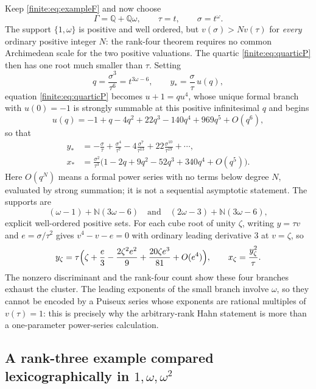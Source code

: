 \documentclass[11pt,letterpaper]{article}
\theoremstyle{definition}
\theoremstyle{remark}
\newcommand{\N}{\mathbb N}
\newcommand{\Q}{\mathbb Q}
\numberwithin{equation}{section}
\begin{document}
Keep \eqref{finite:eq:exampleF} and now choose
\[
 \Gamma=\Q+\Q\omega,\qquad \tau=t,\qquad\sigma=t^\omega .
\]
The support $\{1,\omega\}$ is positive and well ordered, but $v(\sigma)>Nv(\tau)$ for \emph{every} ordinary positive integer $N$: the rank-four theorem requires no common Archimedean scale for the two positive valuations. The quartic \eqref{finite:eq:quarticP} then has one root much smaller than $\tau$. Setting
\[
 q=\frac{\sigma^3}{\tau^6}=t^{3\omega-6},
 \qquad
 y_*=\frac\sigma\tau\,u(q),
\]
equation \eqref{finite:eq:quarticP} becomes $u+1=qu^4$, whose unique formal branch with $u(0)=-1$ is strongly summable at this positive infinitesimal $q$ and begins
\begin{equation}\label{finite:eq:usmall}
 u(q)=-1+q-4q^2+22q^3-140q^4+969q^5+O(q^6),
\end{equation}
so that
\begin{align}
 y_*&=-\frac\sigma\tau+\frac{\sigma^4}{\tau^7}-4\frac{\sigma^7}{\tau^{13}}
 +22\frac{\sigma^{10}}{\tau^{19}}+\cdots,
 \label{finite:eq:ysmall}\\
 x_*&=\frac{\sigma^2}{\tau^3}\bigl(1-2q+9q^2-52q^3+340q^4+O(q^5)\bigr).
 \label{finite:eq:xsmall}
\end{align}
Here $O(q^N)$ means a formal power series with no terms below degree $N$, evaluated by strong summation; it is not a sequential asymptotic statement. The supports are
\[
 (\omega-1)+\N(3\omega-6)
 \quad\text{and}\quad
 (2\omega-3)+\N(3\omega-6),
\]
explicit well-ordered positive sets. For each cube root of unity $\zeta$, writing $y=\tau v$ and $e=\sigma/\tau^2$ gives $v^4-v-e=0$ with ordinary leading derivative $3$ at $v=\zeta$, so
\[
 y_\zeta=\tau\Bigl(\zeta+\frac e3-\frac{2\zeta^2e^2}9+\frac{20\zeta e^3}{81}+O(e^4)\Bigr),
 \qquad x_\zeta=\frac{y_\zeta^2}\tau .
\]
The nonzero discriminant and the rank-four count show these four branches exhaust the cluster. The leading exponents of the small branch involve $\omega$, so they cannot be encoded by a Puiseux series whose exponents are rational multiples of $v(\tau)=1$: this is precisely why the arbitrary-rank Hahn statement is more than a one-parameter power-series calculation.

\subsection{A rank-three example compared lexicographically in \texorpdfstring{$1,\omega,\omega^2$}{1, omega, omega squared}}
\label{finite:sec:quartic}
\end{document}
